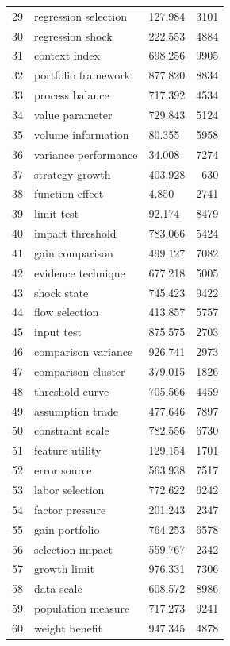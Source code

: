 \documentclass[11pt]{report}
\begin{document}
\begin{longtable}{rllr}
29 & regression selection & 127.984 & 3101 \\
30 & regression shock & 222.553 & 4884 \\
31 & context index & 698.256 & 9905 \\
32 & portfolio framework & 877.820 & 8834 \\
33 & process balance & 717.392 & 4534 \\
34 & value parameter & 729.843 & 5124 \\
35 & volume information & 80.355 & 5958 \\
36 & variance performance & 34.008 & 7274 \\
37 & strategy growth & 403.928 & 630 \\
38 & function effect & 4.850 & 2741 \\
39 & limit test & 92.174 & 8479 \\
40 & impact threshold & 783.066 & 5424 \\
41 & gain comparison & 499.127 & 7082 \\
42 & evidence technique & 677.218 & 5005 \\
43 & shock state & 745.423 & 9422 \\
44 & flow selection & 413.857 & 5757 \\
45 & input test & 875.575 & 2703 \\
46 & comparison variance & 926.741 & 2973 \\
47 & comparison cluster & 379.015 & 1826 \\
48 & threshold curve & 705.566 & 4459 \\
49 & assumption trade & 477.646 & 7897 \\
50 & constraint scale & 782.556 & 6730 \\
51 & feature utility & 129.154 & 1701 \\
52 & error source & 563.938 & 7517 \\
53 & labor selection & 772.622 & 6242 \\
54 & factor pressure & 201.243 & 2347 \\
55 & gain portfolio & 764.253 & 6578 \\
56 & selection impact & 559.767 & 2342 \\
57 & growth limit & 976.331 & 7306 \\
58 & data scale & 608.572 & 8986 \\
59 & population measure & 717.273 & 9241 \\
60 & weight benefit & 947.345 & 4878 \\
\end{longtable}
\end{document}
